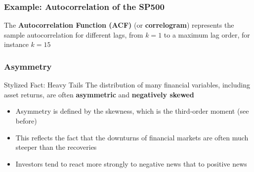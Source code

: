 \documentclass{beamer}
\begin{document}
\begin{frame}
  \frametitle{Example: Autocorrelation of the SP500}
  The \textbf{Autocorrelation Function (ACF)} (or \textbf{correlogram}) represents the sample autocorrelation for different lags, from $k=1$ to a maximum lag order, for instance $k=15$

  
\end{frame}



\begin{frame}
  \frametitle{Asymmetry}

  \begin{block}{Stylized Fact: Heavy Tails}
    The distribution of many financial variables, including asset returns, are often \textbf{asymmetric} and \textbf{negatively skewed}
  \end{block}

  \begin{itemize}
  \item Asymmetry is defined by the skewness, which is the third-order moment (see before)
  \item This reflects the fact that the downturns of financial markets are often much steeper than the recoveries
  \item Investors tend to react more strongly to negative news that to positive news 
  \end{itemize}
\end{frame}
\end{document}
